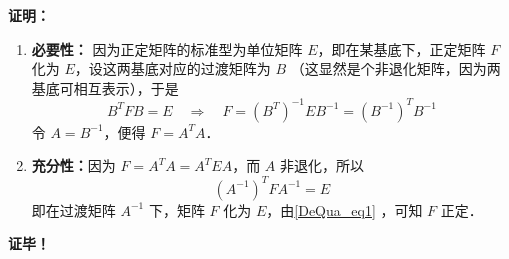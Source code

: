 \textbf{证明：}
\begin{enumerate}
\item \textbf{必要性：}
因为正定矩阵的标准型为单位矩阵 $E$，即在某基底下，正定矩阵 $F$ 化为 $E$，设这两基底对应的过渡矩阵为 $B$ （这显然是个非退化矩阵，因为两基底可相互表示），于是
\begin{equation}
B^TFB=E\quad\Rightarrow\quad F={(B^T)}^{-1}EB^{-1}={(B^{-1})}^TB^{-1}
\end{equation}
令 $A=B^{-1}$，便得 $F=A^TA$．
\item \textbf{充分性：}因为 $F=A^TA=A^TEA$，而 $A$ 非退化，所以
\begin{equation}
{(A^{-1})}^TFA^{-1}=E
\end{equation}
即在过渡矩阵 $A^{-1}$ 下，矩阵 $F$ 化为 $E$，由\autoref{DeQua_eq1} ，可知 $F$ 正定．
\end{enumerate}
\textbf{证毕！}
